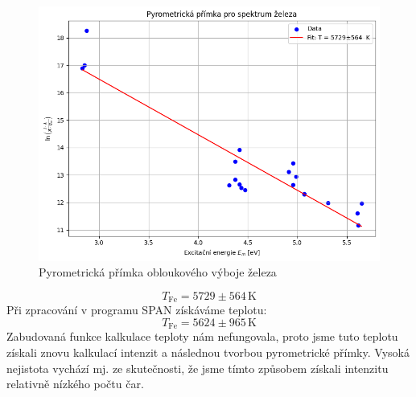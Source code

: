 \documentclass[czech,11pt,a4paper]{article}
\begin{document}
\begin{multicols}{2}
		\begin{figure}[H]
			\centering
			\includegraphics[width=0.9\linewidth]{pyrometrika}
			\caption{Pyrometrická přímka obloukového výboje železa}			
		\end{figure}
		\begin{equation*}
			T_{\mathrm{Fe}} = 5729 \pm 564 \,\mathrm{K}
		\end{equation*}
		Při zpracování v programu SPAN získáváme teplotu:
		\begin{equation*}
			T_{\mathrm{Fe}} = 5624 \pm 965 \,\mathrm{K}
		\end{equation*}
		Zabudovaná funkce kalkulace teploty nám nefungovala, proto jsme tuto teplotu získali znovu kalkulací intenzit a následnou tvorbou pyrometrické přímky. Vysoká nejistota vychází mj. ze skutečnosti, že jsme tímto způsobem získali intenzitu relativně nízkého počtu čar.

\end{multicols}
\end{document}
